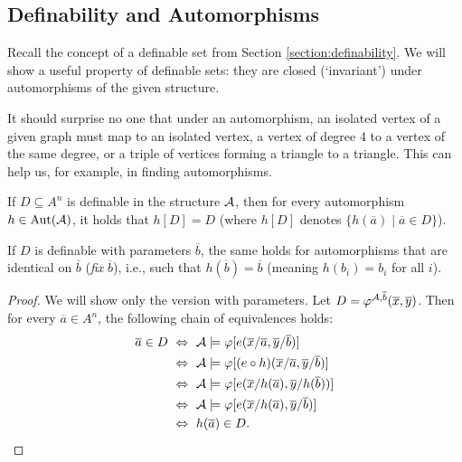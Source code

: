 \subsection{Definability and Automorphisms}

Recall the concept of a definable set from Section \ref{section:definability}. We will show a useful property of definable sets: they are closed (`invariant') under automorphisms of the given structure.

It should surprise no one that under an automorphism, an isolated vertex of a given graph must map to an isolated vertex, a vertex of degree 4 to a vertex of the same degree, or a triple of vertices forming a triangle to a triangle. This can help us, for example, in finding automorphisms.

\begin{proposition}
    If $D \subseteq A^n$ is definable in the structure $\mathcal{A}$, then for every automorphism $h \in \operatorname{Aut}(\mathcal{A})$, it holds that $h[D] = D$ (where $h[D]$ denotes $\{h(\overline{a}) \mid \overline{a} \in D\}$).

    If $D$ is definable with parameters $\overline{b}$, the same holds for automorphisms that are identical on $\overline{b}$ (\emph{fix} $\overline{b}$), i.e., such that $h(\overline{b}) = \overline{b}$ (meaning $h(b_i) = b_i$ for all $i$).
\end{proposition}
\begin{proof}
    We will show only the version with parameters. Let $D = \varphi^{\mathcal{A}, \overline{b}}(\overline{x}, \overline{y})$. Then for every $\overline{a} \in A^n$, the following chain of equivalences holds:
\begin{align*}
\overline{a} \in D\ 
&\Leftrightarrow\ \A \models \varphi[e(\overline{x}/\overline{a}, \overline{y}/\overline{b})] \\
&\Leftrightarrow\ \A \models \varphi[(e \circ h)(\overline{x}/\overline{a}, \overline{y}/\overline{b})] \\
&\Leftrightarrow\ \A \models \varphi[e(\overline{x}/h(\overline{a}), \overline{y}/h(\overline{b}))] \\
&\Leftrightarrow\ \A \models \varphi[e(\overline{x}/h(\overline{a}), \overline{y}/\overline{b})] \\
&\Leftrightarrow\ h(\overline{a}) \in D.
\end{align*}
\end{proof}

